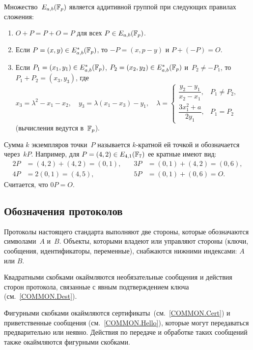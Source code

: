 Множество~$E_{a,b}(\mathbb{F}_p)$ является аддитивной группой 
при следующих правилах сложения:
\begin{enumerate}
\item
$O+P=P+O=P$ для всех $P\in E_{a,b}(\mathbb{F}_p)$.

\item
Если $P=(x,y)\in E_{a,b}^*(\mathbb{F}_p)$, то $-P=(x,p-y)$ и $P+(-P)=O$.

\item
Если $P_1=(x_1,y_1)\in E_{a,b}^*(\mathbb{F}_p)$,
$P_2=(x_2,y_2)\in E_{a,b}^*(\mathbb{F}_p)$ и~$P_2\neq -P_1$, 
то $P_1+P_2=(x_3,y_3)$,
где
$
x_3=\lambda^2-x_1-x_2,\quad
y_3=\lambda(x_1-x_3)-y_1,\quad
\lambda=\left\{
\begin{array}{rl}
\dfrac{y_2-y_1}{x_2-x_1}, & P_1\neq P_2,\\[12pt]
\dfrac{3x_1^2+a}{2 y_1}, & P_1=P_2
\end{array}
\right.
$\\
(вычисления ведутся в~$\mathbb{F}_p$).
\end{enumerate}

Сумма $k$ экземпляров точки~$P$ называется $k$-кратной ей точкой 
и обозначается через~$kP$.
Например, для $P=(4,2)\in E_{4,1}(\mathbb{F}_7)$ ее кратные имеют вид:
\begin{align*}
2P&=(4,2)+(4,2)=(0,1),\quad
&3P&=(0,1)+(4,2)=(0,6),\\
4P&=2(0,1)=(4,5),\quad
&5P&=(0,1)+(0,6)=O.
\end{align*}
Считается, что $0P=O$.

\subsection{Обозначения протоколов}

Протоколы настоящего стандарта выполняют две стороны,
которые обозначаются символами~$A$ и~$B$.
%
%
Объекты, которыми владеют или управляют стороны 
(ключи, сообщения, идентификаторы, переменные),
снабжаются нижними индексами: $A$ или $B$.

Квадратными скобками окаймляются 
необязательные сообщения и действия сторон протокола, 
связанные с явным подтверждением ключа (см.~\ref{COMMON.Dest}).

Фигурными скобками окаймляются сертификаты~(см.~\ref{COMMON.Cert})
и приветственные сообщения (см.~\ref{COMMON.Hello}),
которые могут передаваться предварительно или неявно. 
Действия по передаче и обработке таких сообщений
также окаймляются фигурными скобками.





